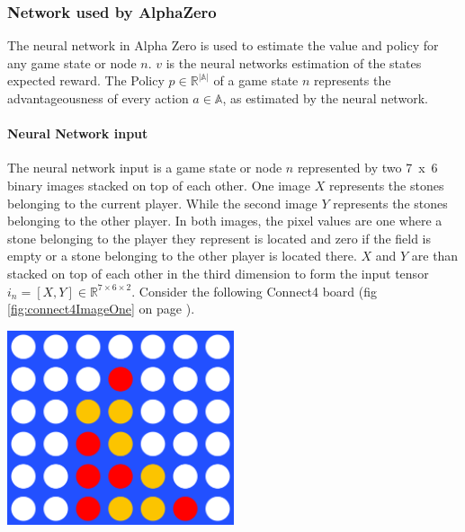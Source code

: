 \documentclass[12pt]{article}
\newcommand{\imgRef}[1]{(fig \ref{#1} on page \pageref{#1})}
\begin{document}
\subsubsection{Network used by AlphaZero}
The neural network in Alpha Zero is used to estimate the value and policy for any game state or node \(n\). \(v\) is the neural networks estimation of the states expected reward. The Policy \(p \in\mathbb{R}^{|\mathbb{A}|}\) of a game state \(n\) represents the advantageousness of every action \(a\in\mathbb{A}\), as estimated by the neural network.
\paragraph{Neural Network input}
The neural network input is a game state or node \(n\) represented by two \mbox{7 x 6} binary images stacked on top of each other. One image \(X\) represents the stones belonging to the current player. While the second image \(Y\) represents the stones belonging to the other player. In both images, the pixel values are one where a stone belonging to the player they represent is located and zero if the field is empty or a stone belonging to the other player is located there. \(X\) and \(Y\) are than stacked on top of each other in the third dimension to form the input tensor \(i_n = [X, Y] \in \mathbb{R}^{7 \times 6 \times 2}\).
Consider the following Connect4 board \imgRef{fig:connect4ImageOne}.

\begin{center}
\includegraphics[width=0.5\textwidth]{connectFourExample}
\label{fig:connect4ImageOne}
\end{center}
\end{document}
